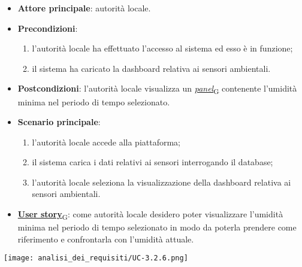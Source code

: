 \begin{itemize}
	\item \textbf{Attore principale}: autorità locale.
	\item \textbf{Precondizioni}:
	      \begin{enumerate}
		      \item l'autorità locale ha effettuato l'accesso al sistema ed esso è in funzione;
		      \item il sistema ha caricato la dashboard relativa ai sensori ambientali.
	      \end{enumerate}
	\item \textbf{Postcondizioni}: l'autorità locale visualizza un \href{https://7last.github.io/docs/pb/documentazione-interna/glossario\#panel}{\textit{panel}\textsubscript{G}} contenente l'umidità minima nel periodo di tempo selezionato.
	\item \textbf{Scenario principale}:
	      \begin{enumerate}
		      \item l'autorità locale accede alla piattaforma;
		      \item il sistema carica i dati relativi ai sensori interrogando il database;
		      \item l'autorità locale seleziona la visualizzazione della dashboard relativa ai sensori ambientali.
	      \end{enumerate}
	\item \href{https://7last.github.io/docs/pb/documentazione-interna/glossario\#user-story}{\textbf{User story}\textsubscript{G}}:
	      come autorità locale desidero poter visualizzare l'umidità minima nel periodo di tempo selezionato
	      in modo da poterla prendere come riferimento e confrontarla con l'umidità attuale.
\end{itemize}
\begin{center}
	\texttt{[image: analisi\_dei\_requisiti/UC-3.2.6.png]}
\end{center}

